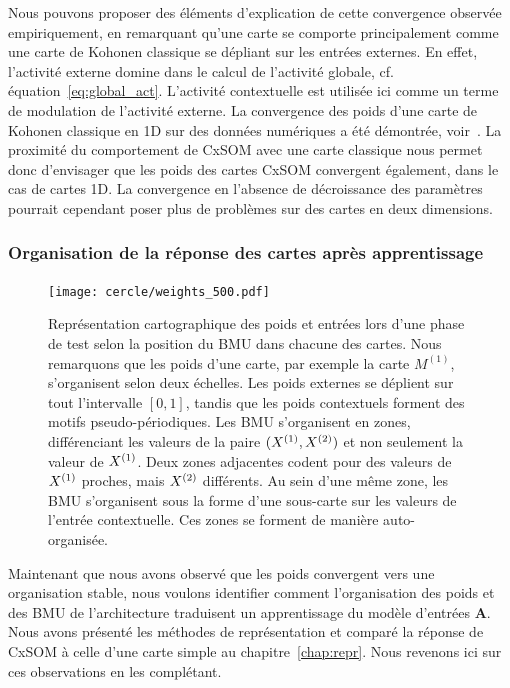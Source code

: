 \documentclass[../main]{subfiles}
\begin{document}
Nous pouvons proposer des éléments d'explication de cette convergence observée empiriquement, en remarquant qu'une carte se comporte principalement comme une carte de Kohonen classique se dépliant sur les entrées externes. En effet, l'activité externe domine dans le calcul de l'activité globale, cf. équation~\ref{eq:global_act}.
L'activité contextuelle est utilisée ici comme un terme de modulation de l'activité externe.
La convergence des poids d'une carte de Kohonen classique en 1D sur des données numériques a été démontrée, voir~\cite{Cottrell1998TheoreticalAO}. 
La proximité du comportement de CxSOM avec une carte classique nous permet donc d'envisager que les poids des cartes CxSOM convergent également, dans le cas de cartes 1D.
La convergence en l'absence de décroissance des paramètres pourrait cependant poser plus de problèmes sur des cartes en deux dimensions.

\subsubsection{Organisation de la réponse des cartes après apprentissage}

\begin{figure}
	\centering\texttt{[image: cercle/weights\_500.pdf]}
	\caption{Représentation cartographique des poids et entrées lors d'une phase de test selon la position du BMU dans chacune des cartes. Nous remarquons que les poids d'une carte, par exemple la carte $M^{(1)}$, s'organisent selon deux échelles. Les poids externes se déplient sur tout l'intervalle $[0,1]$, tandis que les poids contextuels forment des motifs pseudo-périodiques. 
	Les BMU s'organisent en zones, différenciant les valeurs de la paire $(X^{({1})}, X^{({2})})$ et non seulement la valeur de $X^{({1})}$. 
	Deux zones adjacentes codent pour des valeurs de $X^{({1})}$ proches, mais $X^{({2})}$ différents. 
	Au sein d'une même zone, les BMU s'organisent sous la forme d'une sous-carte sur les valeurs de l'entrée contextuelle. Ces zones se forment de manière auto-organisée. \label{fig:w}}
\end{figure}

Maintenant que nous avons observé que les poids convergent vers une organisation stable, nous voulons identifier comment l'organisation des poids et des BMU de l'architecture traduisent un apprentissage du modèle d'entrées \textbf{A}.
Nous avons présenté les méthodes de représentation et comparé la réponse de CxSOM à celle d'une carte simple au chapitre~\ref{chap:repr}. Nous revenons ici sur ces observations en les complétant.
\end{document}
